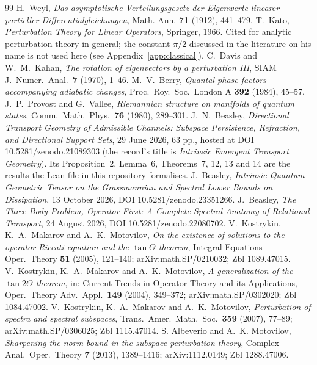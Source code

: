 \begin{thebibliography}{99}
 H.~Weyl, \emph{Das asymptotische Verteilungsgesetz der Eigenwerte linearer partieller Differentialgleichungen}, Math. Ann. \textbf{71} (1912), 441--479.
 T.~Kato, \emph{Perturbation Theory for Linear Operators}, Springer, 1966. Cited for analytic perturbation theory in general; the constant $\pi/2$ discussed in the literature on his name is not used here (see Appendix~\ref{app:classical}).
 C.~Davis and W.~M.~Kahan, \emph{The rotation of eigenvectors by a perturbation III}, SIAM J.\ Numer.\ Anal.\ \textbf{7} (1970), 1--46.
 M.~V.~Berry, \emph{Quantal phase factors accompanying adiabatic changes}, Proc.\ Roy.\ Soc.\ London A \textbf{392} (1984), 45--57.
 J.~P.~Provost and G.~Vallee, \emph{Riemannian structure on manifolds of quantum states}, Comm.\ Math.\ Phys.\ \textbf{76} (1980), 289--301.
 J.~N.~Beasley, \emph{Directional Transport Geometry of Admissible Channels: Subspace Persistence, Refraction, and Directional Support Sets}, 29 June 2026, 63 pp., hosted at DOI 10.5281/zenodo.21089303 (the record's title is \emph{Intrinsic Emergent Transport Geometry}). Its Proposition~2, Lemma~6, Theorems~7, 12, 13 and 14 are the results the Lean file in this repository formalises.
 J.~Beasley, \emph{Intrinsic Quantum Geometric Tensor on the Grassmannian and Spectral Lower Bounds on Dissipation}, 13 October 2026, DOI 10.5281/zenodo.23351266.
 J.~Beasley, \emph{The Three-Body Problem, Operator-First: A Complete Spectral Anatomy of Relational Transport}, 24 August 2026, DOI 10.5281/zenodo.22080702.
 V.~Kostrykin, K.~A.~Makarov and A.~K.~Motovilov, \emph{On the existence of solutions to the operator Riccati equation and the $\tan\Theta$ theorem}, Integral Equations Oper.\ Theory \textbf{51} (2005), 121--140; arXiv:math.SP/0210032; Zbl 1089.47015.
 V.~Kostrykin, K.~A.~Makarov and A.~K.~Motovilov, \emph{A generalization of the $\tan 2\Theta$ theorem}, in: Current Trends in Operator Theory and its Applications, Oper.\ Theory Adv.\ Appl.\ \textbf{149} (2004), 349--372; arXiv:math.SP/0302020; Zbl 1084.47002.
 V.~Kostrykin, K.~A.~Makarov and A.~K.~Motovilov, \emph{Perturbation of spectra and spectral subspaces}, Trans.\ Amer.\ Math.\ Soc.\ \textbf{359} (2007), 77--89; arXiv:math.SP/0306025; Zbl 1115.47014.
 S. Albeverio and A.~K. Motovilov, \emph{Sharpening the norm bound in the subspace perturbation theory}, Complex Anal.\ Oper.\ Theory \textbf{7} (2013), 1389--1416; arXiv:1112.0149; Zbl 1288.47006.

\end{thebibliography}
